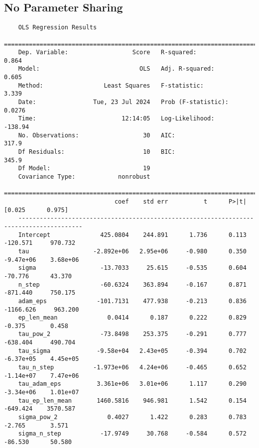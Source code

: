 \subsection{No Parameter Sharing}
\label{tab:anova_nops}
\begin{verbatim}
    OLS Regression Results                            
    ==============================================================================
    Dep. Variable:                  Score   R-squared:                       0.864
    Model:                            OLS   Adj. R-squared:                  0.605
    Method:                 Least Squares   F-statistic:                     3.339
    Date:                Tue, 23 Jul 2024   Prob (F-statistic):             0.0276
    Time:                        12:14:05   Log-Likelihood:                -138.94
    No. Observations:                  30   AIC:                             317.9
    Df Residuals:                      10   BIC:                             345.9
    Df Model:                          19                                         
    Covariance Type:            nonrobust                                         
    ========================================================================================
                               coef    std err          t      P>|t|      [0.025      0.975]
    ----------------------------------------------------------------------------------------
    Intercept              425.0804    244.891      1.736      0.113    -120.571     970.732
    tau                  -2.892e+06   2.95e+06     -0.980      0.350   -9.47e+06    3.68e+06
    sigma                  -13.7033     25.615     -0.535      0.604     -70.776      43.370
    n_step                 -60.6324    363.894     -0.167      0.871    -871.440     750.175
    adam_eps              -101.7131    477.938     -0.213      0.836   -1166.626     963.200
    ep_len_mean              0.0414      0.187      0.222      0.829      -0.375       0.458
    tau_pow_2              -73.8498    253.375     -0.291      0.777    -638.404     490.704
    tau_sigma             -9.58e+04   2.43e+05     -0.394      0.702   -6.37e+05    4.45e+05
    tau_n_step           -1.973e+06   4.24e+06     -0.465      0.652   -1.14e+07    7.47e+06
    tau_adam_eps          3.361e+06   3.01e+06      1.117      0.290   -3.34e+06    1.01e+07
    tau_ep_len_mean       1460.5816    946.981      1.542      0.154    -649.424    3570.587
    sigma_pow_2              0.4027      1.422      0.283      0.783      -2.765       3.571
    sigma_n_step           -17.9749     30.768     -0.584      0.572     -86.530      50.580

\end{verbatim}
